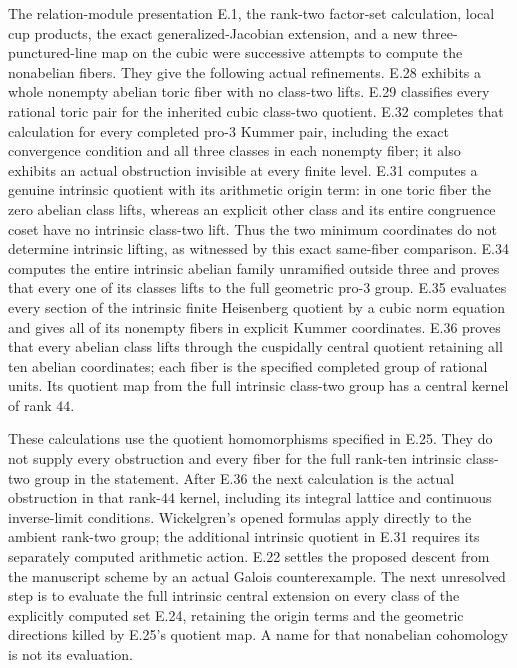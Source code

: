 The relation-module presentation E.1, the rank-two factor-set
calculation, local cup products, the exact generalized-Jacobian
extension, and a new three-punctured-line map on the cubic were
successive attempts to compute the nonabelian fibers. They give
the following actual refinements. E.28 exhibits a whole
nonempty abelian toric fiber with no class-two lifts. E.29
classifies every rational toric pair for the inherited cubic
class-two quotient. E.32 completes that calculation for every
completed pro-$3$ Kummer pair, including the exact convergence
condition and all three classes in each nonempty fiber; it also
exhibits an actual obstruction invisible at every finite level.
E.31 computes a genuine intrinsic quotient with its
arithmetic origin term: in one toric fiber the zero abelian
class lifts, whereas an explicit other class and its entire
congruence coset have no intrinsic class-two lift. Thus the
two minimum coordinates do not determine intrinsic lifting,
as witnessed by this exact same-fiber comparison.
E.34 computes the entire intrinsic abelian family unramified
outside three and proves that every one of its classes lifts
to the full geometric pro-$3$ group.
E.35 evaluates every section of the intrinsic finite
Heisenberg quotient by a cubic norm equation and gives all
of its nonempty fibers in explicit Kummer coordinates.
E.36 proves that every abelian class lifts through the
cuspidally central quotient retaining all ten abelian
coordinates; each fiber is the specified completed group
of rational units. Its quotient map from the full
intrinsic class-two group has a central kernel of rank $44$.

These calculations use the quotient homomorphisms specified in
E.25. They do not supply every obstruction and every fiber for
the full rank-ten intrinsic class-two group in the statement.
After E.36 the next calculation is the actual obstruction
in that rank-$44$ kernel, including its integral lattice
and continuous inverse-limit conditions.
Wickelgren's opened formulas apply directly to the ambient
rank-two group; the additional intrinsic quotient in E.31
requires its separately computed arithmetic action. E.22
settles the proposed descent from the manuscript scheme by an
actual Galois counterexample. The next unresolved step is to
evaluate the full intrinsic central extension on every class
of the explicitly computed set E.24, retaining the origin
terms and the geometric directions killed by E.25's quotient
map. A name for that nonabelian cohomology is not its evaluation.
